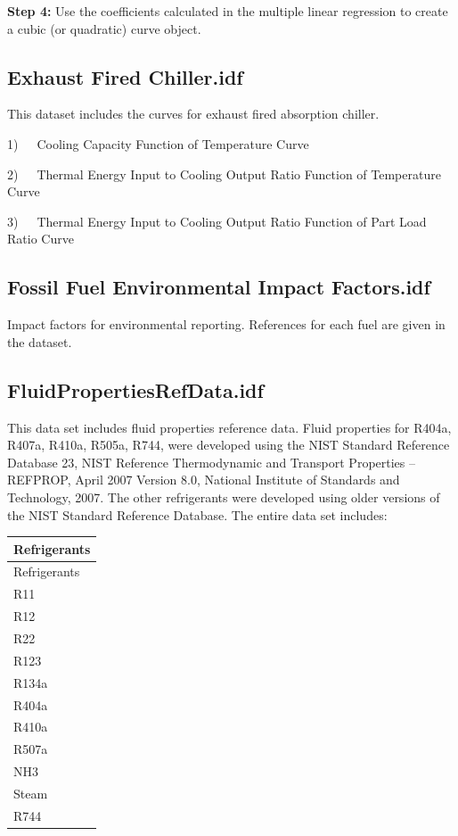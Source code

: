 \textbf{Step 4:} Use the coefficients calculated in the multiple linear regression to create a cubic (or quadratic) curve object.

\subsection{Exhaust Fired Chiller.idf}\label{exhaust-fired-chiller.idf}

This dataset includes the curves for exhaust fired absorption chiller.

1)~~~Cooling Capacity Function of Temperature Curve

2)~~~Thermal Energy Input to Cooling Output Ratio Function of Temperature Curve

3)~~~Thermal Energy Input to Cooling Output Ratio Function of Part Load Ratio Curve

\subsection{Fossil Fuel Environmental Impact Factors.idf}\label{fossil-fuel-environmental-impact-factors.idf}

Impact factors for environmental reporting. References for each fuel are given in the dataset.

\subsection{FluidPropertiesRefData.idf}\label{fluidpropertiesrefdata.idf}

This data set includes fluid properties reference data. Fluid properties for R404a, R407a, R410a, R505a, R744, were developed using the NIST Standard Reference Database 23, NIST Reference Thermodynamic and Transport Properties -- REFPROP, April 2007 Version 8.0, National Institute of Standards and Technology, 2007. The other refrigerants were developed using older versions of the NIST Standard Reference Database. The entire data set includes:

\begin{longtable}[c]{@{}l@{}}
\toprule 
Refrigerants \tabularnewline
\midrule
\endfirsthead

\toprule 
Refrigerants \tabularnewline
\midrule
\endhead

R11 \tabularnewline
R12 \tabularnewline
R22 \tabularnewline
R123 \tabularnewline
R134a \tabularnewline
R404a \tabularnewline
R410a \tabularnewline
R507a \tabularnewline
NH3 \tabularnewline
Steam \tabularnewline
R744 \tabularnewline
\bottomrule
\end{longtable}

